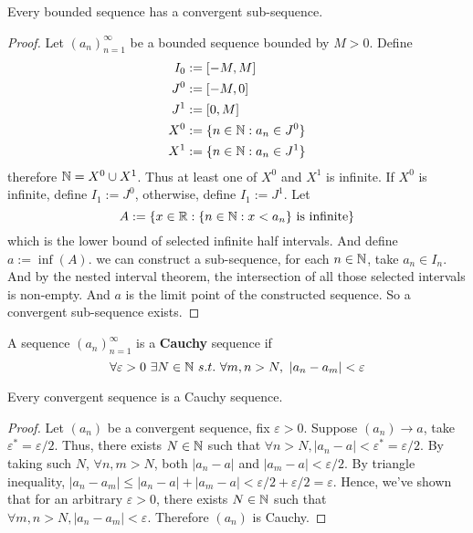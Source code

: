 \documentclass[11pt]{article}
\newcommand{\seq}[2]{({#1}_{#2})_{{#2}=1}^\infty}
\begin{document}
        \begin{theorem}
            Every bounded sequence has a convergent sub-sequence.
        \end{theorem}
        
        \begin{proof}
            Let $\seq{a}{n}$ be a bounded sequence bounded by $M > 0$. Define
            \begin{align}
                I_0 &:= [-M, M] \\
                J^0 &:= [-M, 0] \\
                J^1 &:= [0, M] \\
                X^0 &:= \{n \in \mathbb{N}: a_n \in J^0\} \\
                X^1 &:= \{n \in \mathbb{N}: a_n \in J^1\}
            \end{align}
            therefore $\mathbb{N} = X^0 \cup X^1$. Thus at least one of $X^0$ and $X^1$ is infinite. If $X^0$ is infinite, define $I_1 := J^0$, otherwise, define $I_1 := J^1$. Let 
            \begin{equation}
                A := \{x \in \mathbb{R}: \{n \in \mathbb{N}: x < a_n\} \text{{ is infinite}} \}
            \end{equation}
            which is the lower bound of selected infinite half intervals. And define $a:= \inf(A)$. we can construct a sub-sequence, for each $n \in \mathbb{N}$, take $a_n \in I_n$. And by the nested interval theorem, the intersection of all those selected intervals is non-empty. And $a$ is the limit point of the constructed sequence. So a convergent sub-sequence exists.
        \end{proof}
        
        \begin{definition}
            A sequence $\seq{a}{n}$ is a \textbf{Cauchy} sequence if 
            \begin{equation}
                \forall \varepsilon > 0\ \exists N \in \N\ s.t.\ \forall m, n > N,\ |a_n - a_m| < \varepsilon
            \end{equation}
        \end{definition}
        
        \begin{theorem}
            Every convergent sequence is a Cauchy sequence.
        \end{theorem}
        
        \begin{proof}
            Let $(a_n)$ be a convergent sequence, fix $\varepsilon > 0$. Suppose $(a_n) \to a$, take $\varepsilon^* = \varepsilon / 2$. Thus, there exists $N \in \mathbb{N}$ such that $\forall n > N, |a_n - a| < \varepsilon^* = \varepsilon / 2$. By taking such $N$, $\forall n, m > N$, both $|a_n - a|$ and $|a_m - a| < \varepsilon / 2$. By triangle inequality, $|a_n - a_m| \leq |a_n - a| + |a_m - a| < \varepsilon / 2 + \varepsilon / 2 = \varepsilon$. Hence, we've shown that for an arbitrary $\varepsilon > 0$, there exists $N \in \mathbb{N}$ such that $\forall m, n > N, |a_n - a_m| < \varepsilon$. Therefore $(a_n)$ is Cauchy.
        \end{proof}
        
\end{document}
